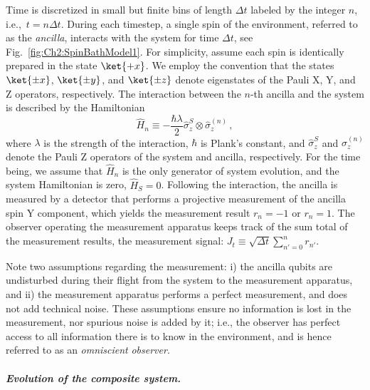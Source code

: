 Time is discretized in small but finite bins of length $\Delta t$
labeled by the integer $n$, i.e.,~$t=n\Delta t$. During each timestep,
a single spin of the environment, referred to as the \emph{ancilla},
interacts with the system for time $\Delta t$, see Fig.~\ref{fig:Ch2:SpinBathModel1}.
For simplicity, assume each spin is identically prepared in the state
$\ket{+x}$. We employ the convention that the states $\ket{\pm x}$,
$\ket{\pm y}$, and $\ket{\pm z}$ denote eigenstates of the Pauli
X, Y, and Z operators, respectively. The interaction between the $n$-th
ancilla and the system is described by the Hamiltonian 
\begin{equation}
\hat{H}_{n}\equiv-\frac{\hbar\lambda}{2}\hat{\sigma}_{z}^{S}\otimes\hat{\sigma}_{z}^{\left(n\right)}\,,
\end{equation}
where $\lambda$ is the strength of the interaction, $\hbar$ is Plank's
constant, and $\hat{\sigma}_{z}^{S}$ and $\hat{\sigma}_{z}^{\left(n\right)}$
denote the Pauli Z operators of the system and ancilla, respectively.
For the time being, we assume that $\hat{H}_{n}$ is the only generator
of system evolution, and the system Hamiltonian is zero, $\hat{H}_{S}=0$.
Following the interaction, the ancilla is measured by a detector that
performs a projective measurement of the ancilla spin  Y component,
which yields the measurement result $r_{n}=-1$ or $r_{n}=1$. The
observer operating the measurement apparatus keeps track of the sum
total of the measurement results, the measurement signal: $J_{t}\equiv\sqrt{\Delta t}\sum_{n'=0}^{n}r_{n'}$. 

Note two assumptions  regarding the measurement: i) the ancilla qubits
are undisturbed during their flight from the system to the measurement
apparatus, and ii) the measurement apparatus performs a perfect measurement,
and does not add technical noise. These assumptions ensure no information
is lost in the measurement, nor spurious noise is added by it; i.e.,
the observer has perfect access to all information there is to know
in the environment, and is hence referred to as an \emph{omniscient}
\emph{observer}. 

\subparagraph{Evolution of the composite system. }

